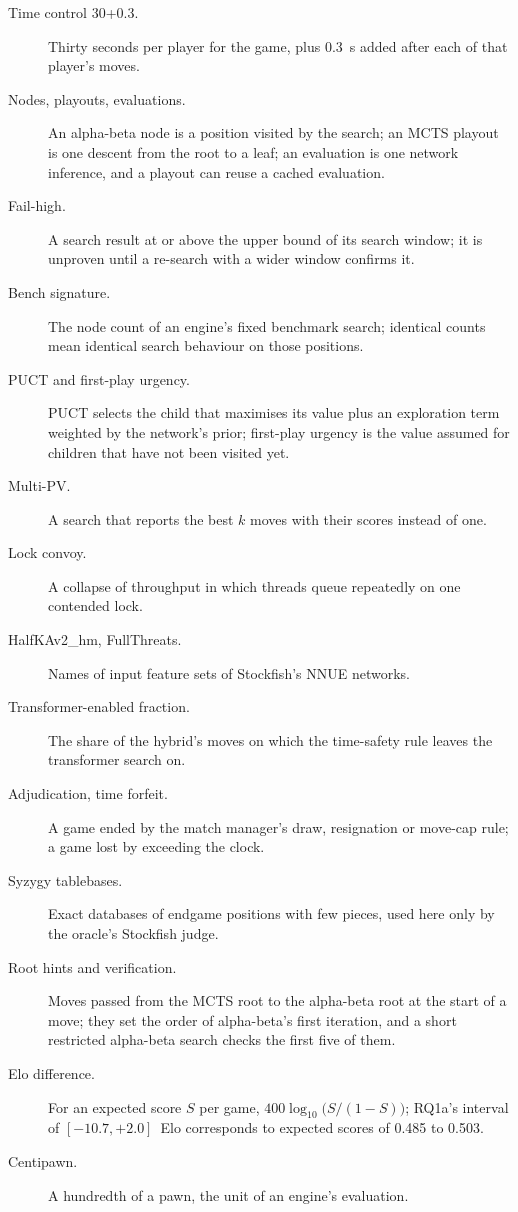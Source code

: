 \documentclass{article}
\begin{document}
\begin{description}
  \item[Time control 30+0.3.] Thirty seconds per player for the game, plus 0.3~s added after each of that player's moves.
  \item[Nodes, playouts, evaluations.] An alpha-beta node is a position visited by the search; an MCTS playout is one descent from the root to a leaf; an evaluation is one network inference, and a playout can reuse a cached evaluation.
  \item[Fail-high.] A search result at or above the upper bound of its search window; it is unproven until a re-search with a wider window confirms it.
  \item[Bench signature.] The node count of an engine's fixed benchmark search; identical counts mean identical search behaviour on those positions.
  \item[PUCT and first-play urgency.] PUCT selects the child that maximises its value plus an exploration term weighted by the network's prior; first-play urgency is the value assumed for children that have not been visited yet.
  \item[Multi-PV.] A search that reports the best $k$ moves with their scores instead of one.
  \item[Lock convoy.] A collapse of throughput in which threads queue repeatedly on one contended lock.
  \item[HalfKAv2\_hm, FullThreats.] Names of input feature sets of Stockfish's NNUE networks.
  \item[Transformer-enabled fraction.] The share of the hybrid's moves on which the time-safety rule leaves the transformer search on.
  \item[Adjudication, time forfeit.] A game ended by the match manager's draw, resignation or move-cap rule; a game lost by exceeding the clock.
  \item[Syzygy tablebases.] Exact databases of endgame positions with few pieces, used here only by the oracle's Stockfish judge.
  \item[Root hints and verification.] Moves passed from the MCTS root to the alpha-beta root at the start of a move; they set the order of alpha-beta's first iteration, and a short restricted alpha-beta search checks the first five of them.
  \item[Elo difference.] For an expected score $S$ per game, $400\log_{10}\bigl(S/(1-S)\bigr)$; RQ1a's interval of $[-10.7, +2.0]$~Elo corresponds to expected scores of 0.485 to 0.503.
  \item[Centipawn.] A hundredth of a pawn, the unit of an engine's evaluation.

\end{description}
\end{document}

